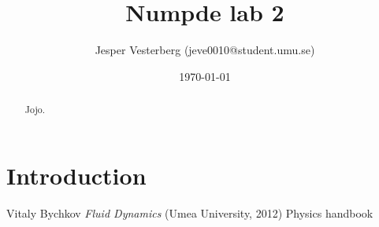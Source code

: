 \documentclass[10pt, a4paper]{article}
\begin{document}
\title{Numpde lab 2}
\date{\today}
\author{Jesper Vesterberg (jeve0010@student.umu.se)}
\maketitle

\thispagestyle{fancy}
\headheight 35pt 
\rhead{\small\today}




\begin{abstract}
Jojo.
\end{abstract}

\newpage

\section{Introduction}

\begin{thebibliography}{99}
 Vitaly Bychkov \textit{Fluid Dynamics} (Umea University, 2012)
 Physics handbook
\end{thebibliography}
\end{document}
